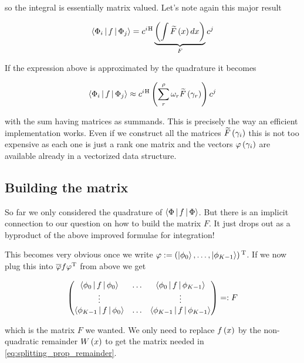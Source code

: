 so the integral is essentially matrix valued. Let's note again this major result

\begin{equation}
  \Braket{ \Phi_i | f | \Phi_j } = c^i{}^{\textnormal{H}} \underbrace{\left( \int \widetilde{F}\left( x \right) dx \right)}_{F} c^j
\end{equation}

If the expression above is approximated by the quadrature it becomes

\begin{equation} \label{eq:quadrature_as_implemented}
  \Braket{ \Phi_i | f | \Phi_j } \approx c^i{}^{\textnormal{H}} \left( \sum_r^\rho \omega_r \widetilde{F}\left( \gamma_r \right) \right) c^j
\end{equation}

with the sum having matrices as summands. This is precisely the way an efficient
implementation works. Even if we construct all the matrices $\widetilde{F}\left( \gamma_i \right)$
this is not too expensive as each one is just a rank one matrix and the vectors
$\varphi\left( \gamma_i \right)$ are available already in a vectorized data structure.

\subsection{Building the matrix}

So far we only considered the quadrature of $\Braket{\Phi | f | \Phi}$. But there
is an implicit connection to our question on how to build the matrix $F$. It just
drops out as a byproduct of the above improved formulae for integration!

This becomes very obvious once we write $\varphi := \left(\Ket{\phi_0}, \ldots, \Ket{\phi_{K-1}}\right){}^{\textnormal{T}}$.
If we now plug this into $\overline{\varphi} f \varphi{}^{\textnormal{T}}$ from above we get

\begin{equation}
  \begin{pmatrix}
    \Braket{\phi_0 | f | \phi_0}     & \hdots & \Braket{\phi_0 | f | \phi_{K-1}} \\
    \vdots                           &        & \vdots \\
    \Braket{\phi_{K-1} | f | \phi_0} & \hdots & \Braket{\phi_{K-1} | f | \phi_{K-1}}
  \end{pmatrix} =: F
\end{equation}

which is the matrix $F$ we wanted. We only need to replace $f\left( x \right)$ by the non-quadratic
remainder $W\left( x \right)$ to get the matrix needed in \eqref{eq:splitting_prop_remainder}.


